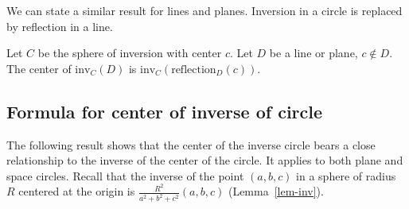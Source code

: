 We can state a similar result for lines and planes.
Inversion in a circle is replaced by reflection in a line.


\begin{theorem}
\label{lem:cenplane}
\cite{Coo71}
Let $C$ be the sphere of inversion with center $c$.
Let $D$ be a line or plane, $c \not \in D$.
The center of $\mbox{inv}_{C}(D)$ is 
$\mbox{inv}_{C}(\mbox{reflection}_{D}(c))$.
\end{theorem}
%


\subsection{Formula for center of inverse of circle}

The following result shows that the center of the inverse circle 
bears a close relationship to the inverse of the center of the circle.
It applies to both plane and space circles.
Recall that the inverse of the point $(a,b,c)$ in a sphere
of radius $R$ centered at the origin is 
$\frac{R^{2}}{a^{2} + b^{2} + c^{2}} (a,b,c)$ 
(Lemma~\ref{lem-inv}).


